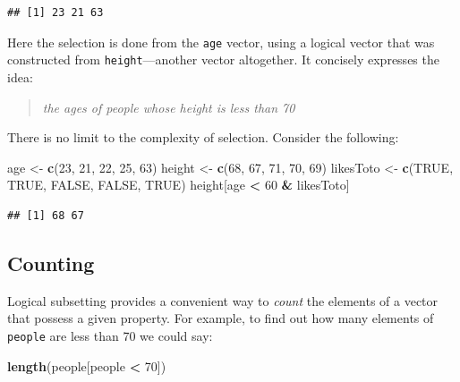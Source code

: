 \documentclass[]{book}
\makeatletter
\newenvironment{Shaded}{\begin{snugshade}}{\end{snugshade}}
\newcommand{\KeywordTok}[1]{\textcolor[rgb]{0.13,0.29,0.53}{\textbf{#1}}}
\newcommand{\DecValTok}[1]{\textcolor[rgb]{0.00,0.00,0.81}{#1}}
\newcommand{\StringTok}[1]{\textcolor[rgb]{0.31,0.60,0.02}{#1}}
\newcommand{\OtherTok}[1]{\textcolor[rgb]{0.56,0.35,0.01}{#1}}
\newcommand{\OperatorTok}[1]{\textcolor[rgb]{0.81,0.36,0.00}{\textbf{#1}}}
\newcommand{\NormalTok}[1]{#1}
\newenvironment{kframe}{%
\medskip{}
\setlength{\fboxsep}{.8em}
 \def\at@end@of@kframe{}%
 \ifinner\ifhmode%
  \def\at@end@of@kframe{\end{minipage}}%
  \begin{minipage}{\columnwidth}%
 \fi\fi%
 \def\FrameCommand##1{\hskip\@totalleftmargin \hskip-\fboxsep
 \colorbox{shadecolor}{##1}\hskip-\fboxsep
     \hskip-\linewidth \hskip-\@totalleftmargin \hskip\columnwidth}%
 \MakeFramed {\advance\hsize-\width
   \@totalleftmargin\z@ \linewidth\hsize
   \@setminipage}}%
 {\par\unskip\endMakeFramed%
 \at@end@of@kframe}
\renewenvironment{Shaded}{\begin{kframe}}{\end{kframe}}
\theoremstyle{definition}
\theoremstyle{definition}
\theoremstyle{definition}
\theoremstyle{remark}
\makeatother
\begin{document}
\begin{verbatim}
## [1] 23 21 63
\end{verbatim}

Here the selection is done from the \texttt{age} vector, using a logical
vector that was constructed from \texttt{height}---another vector
altogether. It concisely expresses the idea:

\begin{quote}
\emph{the ages of people whose height is less than 70}
\end{quote}

There is no limit to the complexity of selection. Consider the
following:

\begin{Shaded}
\begin{Highlighting}[]
\NormalTok{age <-}\StringTok{ }\KeywordTok{c}\NormalTok{(}\DecValTok{23}\NormalTok{, }\DecValTok{21}\NormalTok{, }\DecValTok{22}\NormalTok{, }\DecValTok{25}\NormalTok{, }\DecValTok{63}\NormalTok{)}
\NormalTok{height <-}\StringTok{ }\KeywordTok{c}\NormalTok{(}\DecValTok{68}\NormalTok{, }\DecValTok{67}\NormalTok{, }\DecValTok{71}\NormalTok{, }\DecValTok{70}\NormalTok{, }\DecValTok{69}\NormalTok{)}
\NormalTok{likesToto <-}\StringTok{ }\KeywordTok{c}\NormalTok{(}\OtherTok{TRUE}\NormalTok{, }\OtherTok{TRUE}\NormalTok{, }\OtherTok{FALSE}\NormalTok{, }\OtherTok{FALSE}\NormalTok{, }\OtherTok{TRUE}\NormalTok{)}
\NormalTok{height[age }\OperatorTok{<}\StringTok{ }\DecValTok{60} \OperatorTok{&}\StringTok{ }\NormalTok{likesToto]}
\end{Highlighting}
\end{Shaded}

\begin{verbatim}
## [1] 68 67
\end{verbatim}

\subsection{Counting}\label{counting}

Logical subsetting provides a convenient way to \emph{count} the
elements of a vector that possess a given property. For example, to find
out how many elements of \texttt{people} are less than 70 we could say:

\begin{Shaded}
\begin{Highlighting}[]
\KeywordTok{length}\NormalTok{(people[people }\OperatorTok{<}\StringTok{ }\DecValTok{70}\NormalTok{])}
\end{Highlighting}
\end{Shaded}
\end{document}
